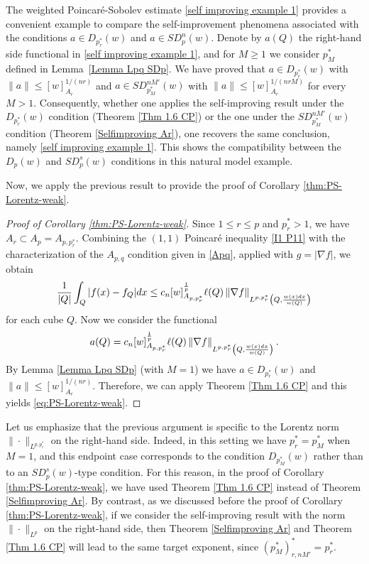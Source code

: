 \documentclass[reqno, 10pt, oneside]{amsart}
\numberwithin{equation}{section}
\newcommand{\strt}[1]{\rule{0pt}{#1}}
\numberwithin{theorem}{section}
\newcommand{\1}{{\rm 1\hspace*{-0.4ex}%
\rule{0.1ex}{1.52ex}\hspace*{0.2ex}}}
\begin{document}
The weighted Poincaré-Sobolev estimate \eqref{self improving example 1} provides a convenient example to compare the self-improvement phenomena associated with the conditions $a\in D_{p_r^{*}}(w)$ and $a\in SD_{p}^{n}(w)$. Denote by $a(Q)$ the right-hand side functional in \eqref{self improving example 1}, and for $M\ge 1$ we consider $p_M^{*}$ defined in Lemma~\ref{Lemma Lpq SDp}. We have proved that $a\in D_{p_r^{*}}(w)$ with $\|a\|\le [w]_{A_r}^{1/(nr)}$ and $a\in SD_{p_M^{*}}^{nM'}(w)$ with $\|a\|\le [w]_{A_r}^{1/(nrM)}$ for every $M>1$. Consequently, whether one applies the self-improving result under the $D_{p_r^{*}}(w)$ condition (Theorem \ref{Thm 1.6 CP}) or the one under the $SD_{p_M^{*}}^{nM'}(w)$ condition (Theorem \ref{Selfimproving Ar}), one recovers the same conclusion, namely \eqref{self improving example 1}. This shows the compatibility between the $D_p(w)$ and $SD_p^s(w)$ conditions in this natural model example.



Now, we apply the previous result to provide the proof of Corollary \ref{thm:PS-Lorentz-weak}.

\begin{proof}[Proof of Corollary \ref{thm:PS-Lorentz-weak}]
	Since $1 \le r \le p$ and $p_r^{*}>1$, we have $A_r\subset A_p = A_{p,p_r^{*}}$. Combining the $(1,1)$ Poincaré inequality \eqref{I1 P11} with the characterization of the $A_{p,q}$ condition given in \eqref{Apq}, applied with $g=|\nabla f|$, we obtain
		\begin{equation*}
			\frac{1}{|Q|}\int_Q |f(x)-f_Q|dx \le c_n  [w]_{A_{p,p_r^{*}}}^\frac{1}{p} \ell (Q)\left\| \nabla f \right\|_{\strt{2.3ex} L^{p,p_r^{*}}\left(Q, \frac{w(x)dx}{w(Q)}\right)}
		\end{equation*}
		for each cube $Q$. Now we consider the functional
		\begin{equation*}
			a(Q)= c_n [w]_{A_{p,p_r^{*}}}^\frac{1}{p} \ell(Q)\left\| \nabla f \right\|_{\strt{2.3ex} L^{p,p_r^{*}}\left(Q, \frac{w(x)dx}{w(Q)}\right)}.
		\end{equation*}	
		By Lemma \ref{Lemma Lpq SDp} (with $M=1$) we have $a\in D_{p_r^{*}}(w)$ and $\|a\|\le [w]_{A_r}^{1/(nr)}$. Therefore, we can apply Theorem \ref{Thm 1.6 CP} and this yields \eqref{eq:PS-Lorentz-weak}.
\end{proof} 

Let us emphasize that the previous argument is specific to the Lorentz norm $\|\cdot\|_{L^{p,p_r^{*}}}$ on the right-hand side. Indeed, in this setting we have $p_r^*=p_M^*$ when $M=1$, and this endpoint case corresponds to the condition $D_{p_M^*}(w)$ rather than to an $SD_p^s(w)$-type condition. For this reason, in the proof of Corollary \ref{thm:PS-Lorentz-weak}, we have used Theorem \ref{Thm 1.6 CP} instead of Theorem \ref{Selfimproving Ar}. By contrast, as we discussed before the proof of Corollary \ref{thm:PS-Lorentz-weak}, if we consider the self-improving result with the norm $\|\cdot\|_{L^{p}}$ on the right-hand side, then Theorem \ref{Selfimproving Ar} and Theorem \ref{Thm 1.6 CP} will lead to the same target exponent, since $(p_M^*)_{r,nM'}^*=p_r^*$.
\end{document}
